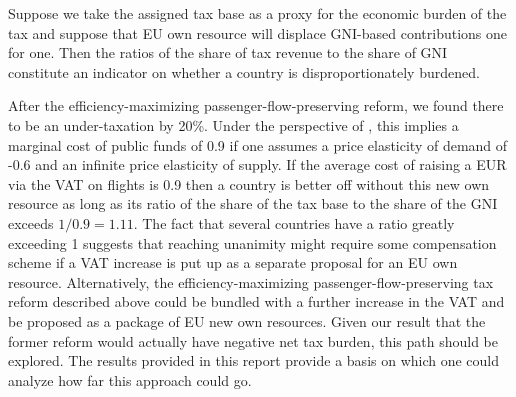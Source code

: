 \documentclass{article}
\begin{document}
Suppose we take the assigned tax base as a proxy for the economic burden of the tax and suppose that EU own resource will displace GNI-based contributions one for one. Then the ratios of the share of tax revenue to the share of GNI constitute an indicator on whether a country is disproportionately burdened. 

After the efficiency-maximizing passenger-flow-preserving reform, we found there to be an under-taxation by 20\%. Under the perspective of \citet{jacobs2018marginal}, this implies a marginal cost of public funds of 0.9 if one assumes a price elasticity of demand of -0.6 and an infinite price elasticity of supply. If the average cost of raising a EUR via the VAT on flights is 0.9 then a country is better off without this new own resource as long as its ratio of the share of the tax base to the share of the GNI exceeds $1/0.9=1.11$. The fact that several countries have a ratio greatly exceeding 1 suggests that reaching unanimity might require some compensation scheme if a VAT increase is put up as a separate proposal for an EU own resource. Alternatively, the efficiency-maximizing passenger-flow-preserving tax reform described above could be bundled with a further increase in the VAT and be proposed as a package of EU new own resources. Given our result that the former reform would actually have negative net tax burden, this path should be explored. The results provided in this report provide a basis on which one could analyze how far this approach could go.
\end{document}
